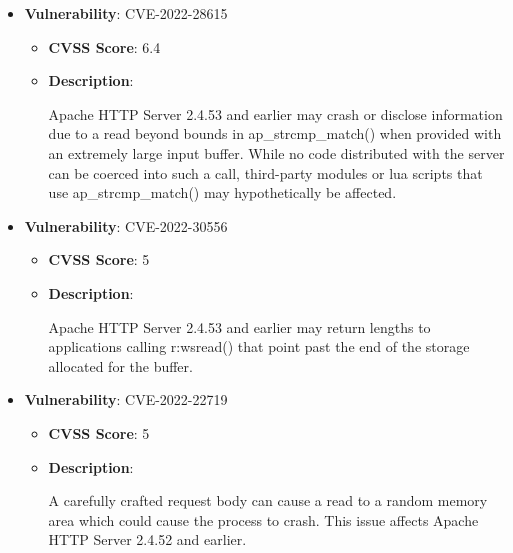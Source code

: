 \documentclass{article}
\begin{document}
\begin{itemize}
        \item \textbf{Vulnerability}: CVE-2022-28615
        \begin{itemize}
            \item \textbf{CVSS Score}:  6.4 
            \item \textbf{Description}:
            \parbox[t]{0.9\linewidth}{
                \ttfamily Apache HTTP Server 2.4.53 and earlier may crash or disclose information due to a read beyond bounds in ap\_strcmp\_match() when provided with an extremely large input buffer. While no code distributed with the server can be coerced into such a call, third-party modules or lua scripts that use ap\_strcmp\_match() may hypothetically be affected.
            }
        \end{itemize}
    
        \item \textbf{Vulnerability}: CVE-2022-30556
        \begin{itemize}
            \item \textbf{CVSS Score}:  5 
            \item \textbf{Description}:
            \parbox[t]{0.9\linewidth}{
                \ttfamily Apache HTTP Server 2.4.53 and earlier may return lengths to applications calling r:wsread() that point past the end of the storage allocated for the buffer.
            }
        \end{itemize}
    
        \item \textbf{Vulnerability}: CVE-2022-22719
        \begin{itemize}
            \item \textbf{CVSS Score}:  5 
            \item \textbf{Description}:
            \parbox[t]{0.9\linewidth}{
                \ttfamily A carefully crafted request body can cause a read to a random memory area which could cause the process to crash. This issue affects Apache HTTP Server 2.4.52 and earlier.
            }
        \end{itemize}
    

\end{itemize}
\end{document}
